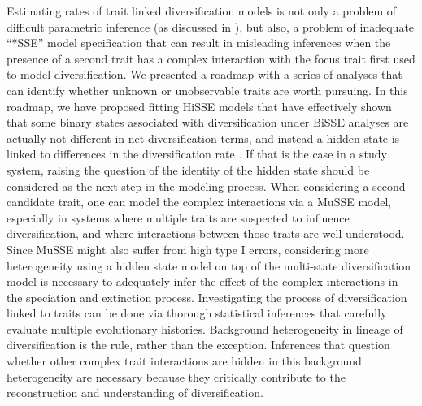 Estimating rates of trait linked diversification models is not only a problem of difficult parametric inference (as discussed in  \citealt{rabosky_2010, beaulieu_2015}), but also, a problem of inadequate  ``*SSE'' model specification that can result in misleading inferences when the presence of a second trait has a complex interaction with the focus trait first used to model diversification. 
We presented a roadmap with a series of analyses that can identify whether unknown or unobservable traits are worth pursuing. 
In this roadmap, we have proposed fitting HiSSE models that have effectively shown that some binary states associated with diversification under BiSSE analyses are actually not different in net diversification terms, and instead a hidden state is linked to differences in the diversification rate \citep{beaulieu_2016}.  
If that is the case in a study system, raising the question of the identity of the hidden state should be considered as the next step in the modeling process. 
When considering a second candidate trait, one can model the complex interactions via a MuSSE model, especially in systems where multiple traits are suspected to influence diversification, and where interactions between those traits are well understood. 
Since MuSSE might also suffer from high type I errors, considering more heterogeneity using a hidden state model on top of the multi-state diversification model is necessary to adequately infer the effect of the complex interactions in the speciation and extinction process.
Investigating the process of diversification linked to traits can be done via thorough statistical inferences that carefully evaluate multiple evolutionary histories. 
Background heterogeneity in lineage of diversification is the rule, rather than the exception. 
Inferences that question whether other complex trait interactions are hidden in this background heterogeneity are necessary because they critically contribute to the reconstruction and understanding of diversification. 